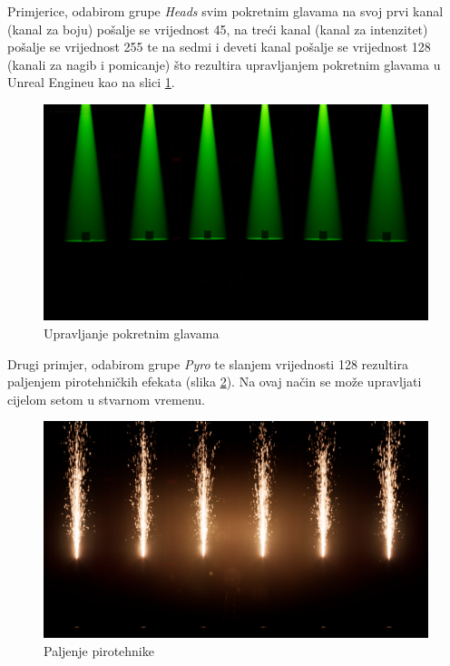 \documentclass[times, utf8, zavrsni, numeric]{fer}
\begin{document}
Primjerice, odabirom grupe \emph{Heads} svim pokretnim glavama na svoj prvi kanal (kanal za boju) pošalje se vrijednost 45, na treći kanal (kanal za intenzitet) pošalje se vrijednost 255 te na sedmi i deveti kanal pošalje se vrijednost 128 (kanali za nagib i pomicanje) što rezultira upravljanjem pokretnim glavama u Unreal Engineu kao na slici \ref{fig:slika 6-10}.

\begin{figure}[htp]
	\centering
	\includegraphics[width=\linewidth]{slika 6-10.png}
	\caption{Upravljanje pokretnim glavama}
	\label{fig:slika 6-10}
\end{figure}

Drugi primjer, odabirom grupe \emph{Pyro} te slanjem vrijednosti 128 rezultira paljenjem pirotehničkih efekata (slika \ref{fig:slika 6-11}). Na ovaj način se može upravljati cijelom setom u stvarnom vremenu.

\begin{figure}[htp]
	\centering
	\includegraphics[width=\linewidth]{slika 6-11.png}
	\caption{Paljenje pirotehnike}
	\label{fig:slika 6-11}
\end{figure}
\end{document}
